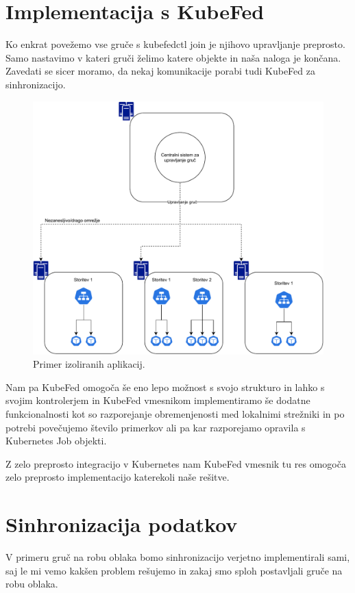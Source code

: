 \documentclass[a4paper, 12pt]{book}
\begin{document}
\section{Implementacija s KubeFed}
Ko enkrat povežemo vse gruče s kubefedctl join je njihovo upravljanje preprosto.
Samo nastavimo v kateri gruči želimo katere objekte in naša naloga je končana.
Zavedati se sicer moramo, da nekaj komunikacije porabi tudi KubeFed za sinhronizacijo.
\begin{figure}[h]
\begin{center}
\includegraphics[width=1.0\textwidth]{images/upravljanje-robnih-gruc.pdf}
\end{center}
\caption{Primer izoliranih aplikacij.}
\label{problem-prevelike-latence}
\end{figure}

Nam pa KubeFed omogoča še eno lepo možnost s svojo strukturo in lahko s svojim kontrolerjem in KubeFed vmesnikom implementiramo še dodatne funkcionalnosti kot so razporejanje obremenjenosti med lokalnimi strežniki in po potrebi povečujemo število primerkov ali pa kar razporejamo opravila s Kubernetes Job objekti.

Z zelo preprosto integracijo v Kubernetes nam KubeFed vmesnik tu res omogoča zelo preprosto implementacijo katerekoli naše rešitve.
\section{Sinhronizacija podatkov}
V primeru gruč na robu oblaka bomo sinhronizacijo verjetno implementirali sami, saj le mi vemo kakšen problem rešujemo in zakaj smo sploh postavljali gruče na robu oblaka.
\end{document}
